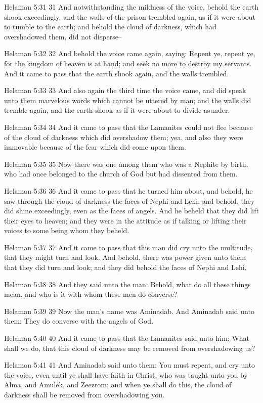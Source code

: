 Helaman 5:31
 31 And notwithstanding the mildness of the voice, behold the
earth shook exceedingly, and the walls of the prison trembled
again, as if it were about to tumble to the earth; and behold the
cloud of darkness, which had overshadowed them, did not
disperse--

Helaman 5:32
 32 And behold the voice came again, saying: Repent ye, repent
ye, for the kingdom of heaven is at hand; and seek no more to
destroy my servants. And it came to pass that the earth shook
again, and the walls trembled.

Helaman 5:33
 33 And also again the third time the voice came, and did speak
unto them marvelous words which cannot be uttered by man; and the
walls did tremble again, and the earth shook as if it were about
to divide asunder.

Helaman 5:34
 34 And it came to pass that the Lamanites could not flee because
of the cloud of darkness which did overshadow them; yea, and also
they were immovable because of the fear which did come upon them.

Helaman 5:35
 35 Now there was one among them who was a Nephite by birth, who
had once belonged to the church of God but had dissented from
them.

Helaman 5:36
 36 And it came to pass that he turned him about, and behold, he
saw through the cloud of darkness the faces of Nephi and Lehi;
and behold, they did shine exceedingly, even as the faces of
angels. And he beheld that they did lift their eyes to heaven;
and they were in the attitude as if talking or lifting their
voices to some being whom they beheld.

Helaman 5:37
 37 And it came to pass that this man did cry unto the multitude,
that they might turn and look. And behold, there was power given
unto them that they did turn and look; and they did behold the
faces of Nephi and Lehi.

Helaman 5:38
 38 And they said unto the man: Behold, what do all these things
mean, and who is it with whom these men do converse?

Helaman 5:39
 39 Now the man's name was Aminadab. And Aminadab said unto
them: They do converse with the angels of God.

Helaman 5:40
 40 And it came to pass that the Lamanites said unto him: What
shall we do, that this cloud of darkness may be removed from
overshadowing us?

Helaman 5:41
 41 And Aminadab said unto them: You must repent, and cry unto
the voice, even until ye shall have faith in Christ, who was
taught unto you by Alma, and Amulek, and Zeezrom; and when ye
shall do this, the cloud of darkness shall be removed from
overshadowing you.


